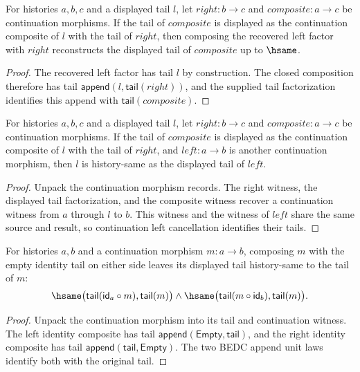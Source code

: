 \begin{theorem}
\label{thm:continuation-morphism-comp-left-factor-reconstructs}
For histories $a,b,c$ and a displayed tail $l$, let $right:b\to c$ and
$composite:a\to c$ be continuation morphisms. If the tail of $composite$ is
displayed as the continuation composite of $l$ with the tail of $right$, then
composing the recovered left factor with $right$ reconstructs the displayed
tail of $composite$ up to $\hsame$.
\end{theorem}
\begin{proof}
The recovered left factor has tail $l$ by construction. The closed composition
therefore has tail $\mathsf{append}(l,\mathsf{tail}(right))$, and the supplied
tail factorization identifies this append with $\mathsf{tail}(composite)$.
\end{proof}

\begin{theorem}
\label{thm:continuation-morphism-comp-left-factor-tail-hsame}
For histories $a,b,c$ and a displayed tail $l$, let $right:b\to c$ and
$composite:a\to c$ be continuation morphisms. If the tail of $composite$ is
displayed as the continuation composite of $l$ with the tail of $right$, and
$left:a\to b$ is another continuation morphism, then $l$ is history-same as
the displayed tail of $left$.
\end{theorem}
\begin{proof}
Unpack the continuation morphism records. The right witness, the displayed
tail factorization, and the composite witness recover a continuation witness
from $a$ through $l$ to $b$. This witness and the witness of $left$ share the
same source and result, so continuation left cancellation identifies their
tails.
\end{proof}

\begin{theorem}
\label{thm:continuation-morphism-identity-tail-hsame}
For histories $a,b$ and a continuation morphism $m:a\to b$, composing $m$ with
the empty identity tail on either side leaves its displayed tail history-same
to the tail of $m$:
$$
\hsame\bigl(\mathsf{tail}(\mathsf{id}_a\circ m),\mathsf{tail}(m)\bigr)
\land
\hsame\bigl(\mathsf{tail}(m\circ \mathsf{id}_b),\mathsf{tail}(m)\bigr).
$$
\end{theorem}
\begin{proof}
Unpack the continuation morphism into its tail and continuation witness. The
left identity composite has tail $\mathsf{append}(\mathsf{Empty},\mathsf{tail})$,
and the right identity composite has tail
$\mathsf{append}(\mathsf{tail},\mathsf{Empty})$. The two BEDC append unit laws
identify both with the original tail.
\end{proof}

